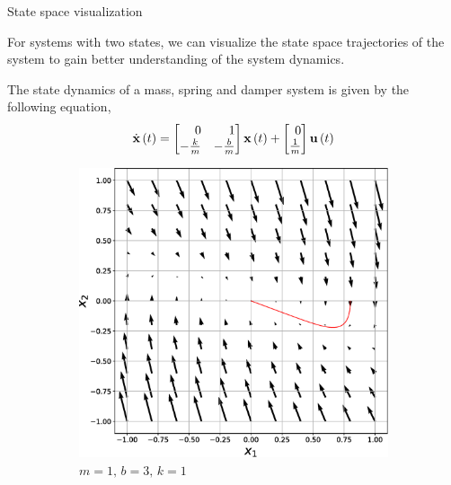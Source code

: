 \documentclass[aspectratio=169]{beamer}
\def\mf{\ensuremath\mathbf}
\def\lp{\ensuremath\left(}
\def\rp{\ensuremath\right)}
\def\bmx{\ensuremath\begin{bmatrix*}[r]}
\def\emx{\ensuremath\end{bmatrix*}}
\newcommand{\ct}[1]{\lp #1\rp}
\begin{document}
\begin{frame}{State space visualization}
\begin{small}
For systems with two states, we can  visualize the state space trajectories of the system to gain better understanding of the system dynamics.

The state dynamics of a mass, spring and damper system is given by the following equation,
\[ \dot{\mf{x}}\ct{t} = \bmx 0 & 1\\ -\frac{k}{m} & -\frac{b}{m}\emx \mf{x}\ct{t} + \bmx 0 \\ \frac{1}{m}\emx \mf{u}\ct{t} \]
\end{small}
\vspace{-0.3cm}
\begin{figure}
    \begin{subfigure}[b]{0.3\textwidth}
        \includegraphics[width=\linewidth]{img/osc2.eps}
        \captionsetup{labelformat=empty}
        \caption{\small $m=1, \, b=3, \, k=1$}
        \label{fig:gull}
    \end{subfigure}\hspace{0.1cm}
    \begin{subfigure}[b]{0.3\textwidth}

\end{subfigure}
\end{figure}
\end{frame}
\end{document}
